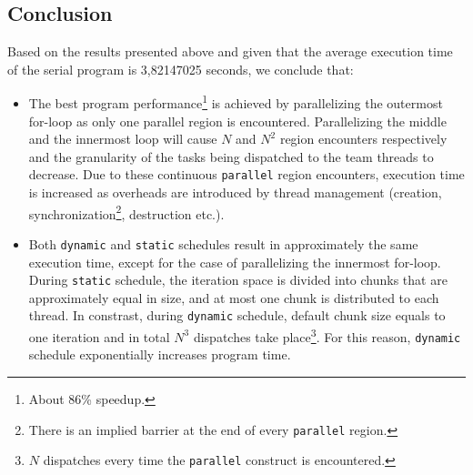 \documentclass{article}
\def\code#1{\texttt{#1}}
\begin{document}
\subsection{Conclusion}
Based on the results presented above and given that the average execution time of the serial
program is 3,82147025 seconds, we conclude that:

\begin{itemize}
 \item The best program performance\footnote{About 86\% speedup.} is achieved by
       parallelizing the outermost for-loop as only one parallel region is encountered.
       Parallelizing the middle and the innermost loop will cause $N$ and $N^2$ region
       encounters respectively and the granularity of the tasks being dispatched to
       the team threads to decrease. Due to these continuous \code{parallel} region
       encounters, execution time is increased as overheads are introduced by thread
       management (creation, synchronization\footnote{There is an implied barrier at
       the end of every \code{parallel} region.}, destruction etc.).
 \item Both \code{dynamic} and \code{static} schedules result in approximately the
       same execution time, except for the case of parallelizing the innermost 
       for-loop. During \code{static} schedule, the iteration space is divided
       into chunks that are approximately equal in size, and at most one chunk
       is distributed to each thread. In constrast, during \code{dynamic} schedule,
       default chunk size equals to one iteration and in total $N^3$ dispatches
       take place\footnote{$N$ dispatches every time the \code{parallel} construct
       is encountered.}. For this reason, \code{dynamic} schedule exponentially
       increases program time.
\end{itemize}
\end{document}
